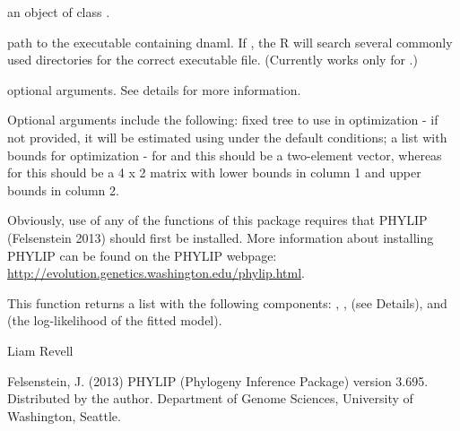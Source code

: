 \documentclass[a4paper]{book}
\begin{document}
%
\begin{Arguments}
\begin{ldescription}
\item[\code{X}] an object of class .
\item[\code{path}] path to the executable containing dnaml. If , the R will search several commonly used directories for the correct executable file. (Currently works only for .)
\item[\code{...}] optional arguments. See details for more information.
\end{ldescription}
\end{Arguments}
%
\begin{Details}\relax
Optional arguments include the following:  fixed tree to use in optimization - if not provided, it will be estimated using  under the default conditions;  a list with bounds for optimization - for  and  this should be a two-element vector, whereas for  this should be a 4 x 2 matrix with lower bounds in column 1 and upper bounds in column 2.

Obviously, use of any of the functions of this package requires that PHYLIP (Felsenstein 2013) should first be installed. More information about installing PHYLIP can be found on the PHYLIP webpage: \url{http://evolution.genetics.washington.edu/phylip.html}.
\end{Details}
%
\begin{Value}
This function returns a list with the following components: , ,  (see Details), and  (the log-likelihood of the fitted model).
\end{Value}
%
\begin{Author}\relax
Liam Revell 
\end{Author}
%
\begin{References}\relax
Felsenstein, J. (2013) PHYLIP (Phylogeny Inference Package) version 3.695. Distributed by the author. Department of Genome Sciences, University of Washington, Seattle.
\end{References}
%
\begin{SeeAlso}\relax
{}
\end{SeeAlso}
%
\begin{Examples}
\end{Examples}
\end{document}

